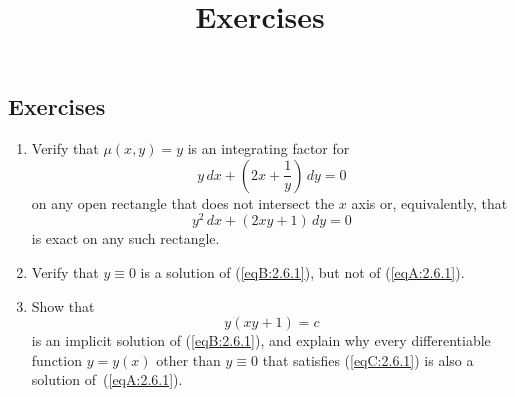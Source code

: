 \documentclass{ximera}
\title{Exercises} \license{CC BY-NC-SA 4.0}
\begin{document}
\begin{abstract}
\end{abstract}
\maketitle

\begin{onlineOnly}
\section*{Exercises}
\end{onlineOnly}



\begin{problem}\label{exer:2.6.1}
\begin{enumerate}
\item %
Verify that $\mu(x,y)=y$ is an integrating factor for
\begin{equation}\label{eqA:2.6.1}
y\,dx+\left(2x+\frac{1}{y}\right)\,dy=0
\end{equation}
on any open rectangle that does not intersect  the $x$ axis
or, equivalently,  that
\begin{equation}\label{eqB:2.6.1}
y^2\,dx+(2xy+1)\,dy=0
\end{equation}
is exact on any such rectangle.
\item %
Verify that $y\equiv0$  is a solution of  (\ref{eqB:2.6.1}),
but not of  (\ref{eqA:2.6.1}).
\item %
Show that
\begin{equation}\label{eqC:2.6.1}
y(xy+1)=c
\end{equation}
is an implicit solution of (\ref{eqB:2.6.1}), and explain why
every differentiable function $y=y(x)$ other than $y\equiv0$
that satisfies  (\ref{eqC:2.6.1})
 is also a solution of~(\ref{eqA:2.6.1}).
\end{enumerate}
\end{problem}
\end{document}

